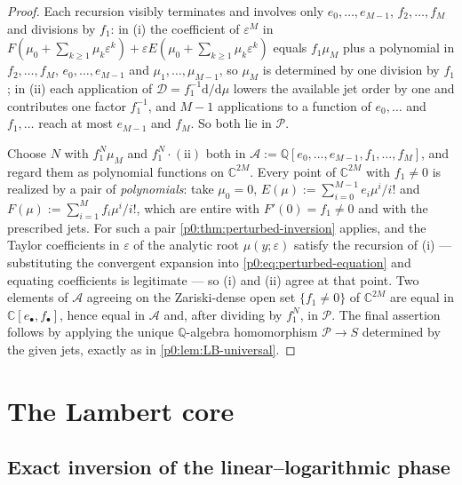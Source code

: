 \documentclass[11pt,a4paper,oneside]{book}
\theoremstyle{plain}
\theoremstyle{definition}
\theoremstyle{remark}
\newcommand{\Rat}{\mathbb{Q}}
\newcommand{\Cplx}{\mathbb{C}}
\newcommand{\dd}{\mathrm{d}}
\begin{document}
\begin{proof}
Each recursion visibly terminates and involves only $e_{0},\dots,e_{M-1}$,
$f_{2},\dots,f_{M}$ and divisions by $f_{1}$: in (i) the coefficient of
$\varepsilon^{M}$ in $F(\mu_{0}+\sum_{k\ge1}\mu_{k}\varepsilon^{k})
+\varepsilon E(\mu_{0}+\sum_{k\ge1}\mu_{k}\varepsilon^{k})$ equals
$f_{1}\mu_{M}$ plus a polynomial in $f_{2},\dots,f_{M}$,
$e_{0},\dots,e_{M-1}$ and $\mu_{1},\dots,\mu_{M-1}$, so $\mu_{M}$ is
determined by one division by $f_{1}$; in (ii) each application of
$\mathcal{D}=f_{1}^{-1}\dd/\dd\mu$ lowers the available jet order by one and
contributes one factor $f_{1}^{-1}$, and $M-1$ applications to a function of
$e_{0},\dots$ and $f_{1},\dots$ reach at most $e_{M-1}$ and $f_{M}$.  So both
lie in $\mathcal{P}$.

Choose $N$ with $f_{1}^{N}\mu_{M}$ and $f_{1}^{N}\cdot(\text{ii})$ both in
$\mathcal{A}:=\Rat[e_{0},\dots,e_{M-1},f_{1},\dots,f_{M}]$, and regard them as
polynomial functions on $\Cplx^{2M}$.  Every point of $\Cplx^{2M}$ with
$f_{1}\ne0$ is realized by a pair of \emph{polynomials}: take $\mu_{0}=0$,
$E(\mu):=\sum_{i=0}^{M-1}e_{i}\mu^{i}/i!$ and
$F(\mu):=\sum_{i=1}^{M}f_{i}\mu^{i}/i!$, which are entire with
$F'(0)=f_{1}\ne0$ and with the prescribed jets.  For such a pair
\cref{p0:thm:perturbed-inversion} applies, and the Taylor coefficients in
$\varepsilon$ of the analytic root $\mu(y;\varepsilon)$ satisfy the recursion
of (i) --- substituting the convergent expansion into
\eqref{p0:eq:perturbed-equation} and equating coefficients is legitimate ---
so (i) and (ii) agree at that point.  Two elements of $\mathcal{A}$ agreeing on
the Zariski-dense open set $\{f_{1}\ne0\}$ of $\Cplx^{2M}$ are equal in
$\Cplx[e_{\bullet},f_{\bullet}]$, hence equal in $\mathcal{A}$ and, after
dividing by $f_{1}^{N}$, in $\mathcal{P}$.  The final assertion follows by
applying the unique $\Rat$-algebra homomorphism $\mathcal{P}\to S$ determined
by the given jets, exactly as in \cref{p0:lem:LB-universal}.
\end{proof}

\section{The Lambert core}\label{p0:sec:core}

\subsection{Exact inversion of the linear--logarithmic phase}
\end{document}
